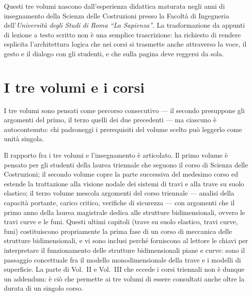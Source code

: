 
\preface

Questi tre volumi nascono dall'esperienza didattica maturata negli anni di
insegnamento della Scienza delle Costruzioni presso la Facoltà di Ingegneria
dell'\textit{Università degli Studi di Roma ``La Sapienza''}. La
trasformazione da appunti di lezione a testo scritto non è una semplice
trascrizione: ha richiesto di rendere esplicita l'architettura logica che
nei corsi si trasmette anche attraverso la voce, il gesto e il dialogo con
gli studenti, e che sulla pagina deve reggersi da sola.


\section*{I tre volumi e i corsi}

I tre volumi sono pensati come percorso consecutivo --- il
secondo presuppone gli argomenti del primo, il terzo quelli
dei due precedenti --- ma ciascuno è autocontenuto: chi
padroneggi i prerequisiti del volume scelto può leggerlo
come unità singola.

Il rapporto fra i tre volumi e l'insegnamento è articolato. Il
primo volume è pensato per gli studenti della laurea
triennale che seguono il corso di Scienza delle Costruzioni;
il secondo volume copre la parte successiva del medesimo
corso ed estende la trattazione alla visione nodale dei
sistemi di travi e alla trave su suolo elastico; il terzo
volume mescola argomenti del corso triennale --- analisi
della capacità portante, carico critico, verifiche di
sicurezza --- con argomenti che il primo anno della laurea
magistrale dedica alle strutture bidimensionali, ovvero le
travi curve e le funi. Questi ultimi capitoli (trave su
suolo elastico, travi curve, funi) costituiscono propriamente
la prima fase di un corso di meccanica delle strutture
bidimensionali, e vi sono inclusi perché forniscono al
lettore le chiavi per interpretare il funzionamento delle
strutture bidimensionali piane e curve: sono il passaggio
concettuale fra il modello monodimensionale della trave e i
modelli di superficie. La parte di Vol.~II e Vol.~III che
eccede i corsi triennali non è dunque un addendum: è ciò che
permette ai tre volumi di essere consultati anche oltre la
durata di un singolo corso.

